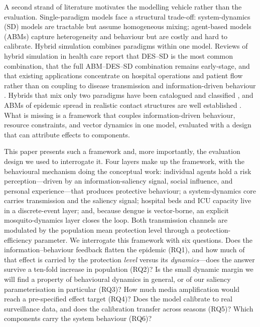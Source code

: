 \documentclass[]{interact}
\begin{document}
A second strand of literature motivates the modelling vehicle rather than the evaluation. Single-paradigm models face a structural trade-off: system-dynamics (SD) models are tractable but assume homogeneous mixing; agent-based models (ABMs) capture heterogeneity and behaviour but are costly and hard to calibrate. Hybrid simulation combines paradigms within one model. Reviews of hybrid simulation in health care report that DES--SD is the most common combination, that the full ABM--DES--SD combination remains early-stage, and that existing applications concentrate on hospital operations and patient flow rather than on coupling to disease transmission and information-driven behaviour \cite{kar2025hybrid}. Hybrids that mix only two paradigms have been catalogued and classified \cite{borshchev2004system,morgan2017toolkit}, and ABMs of epidemic spread in realistic contact structures are well established \cite{eubank2004modelling,ferguson2020impact,prem2020effect,chinazzi2020effect}. What is missing is a framework that couples information-driven behaviour, resource constraints, and vector dynamics in one model, evaluated with a design that can attribute effects to components.

This paper presents such a framework and, more importantly, the evaluation design we used to interrogate it. Four layers make up the framework, with the behavioural mechanism doing the conceptual work: individual agents hold a risk perception---driven by an information-saliency signal, social influence, and personal experience---that produces protective behaviour; a system-dynamics core carries transmission and the saliency signal; hospital beds and ICU capacity live in a discrete-event layer; and, because dengue is vector-borne, an explicit mosquito-dynamics layer closes the loop. Both transmission channels are modulated by the population mean protection level through a protection-efficiency parameter. We interrogate this framework with six questions. Does the information--behaviour feedback flatten the epidemic (RQ1), and how much of that effect is carried by the protection \emph{level} versus its \emph{dynamics}---does the answer survive a ten-fold increase in population (RQ2)? Is the small dynamic margin we will find a property of behavioural dynamics in general, or of our saliency parameterisation in particular (RQ3)? How much media amplification would reach a pre-specified effect target (RQ4)? Does the model calibrate to real surveillance data, and does the calibration transfer across seasons (RQ5)? Which components carry the system behaviour (RQ6)?
\end{document}
